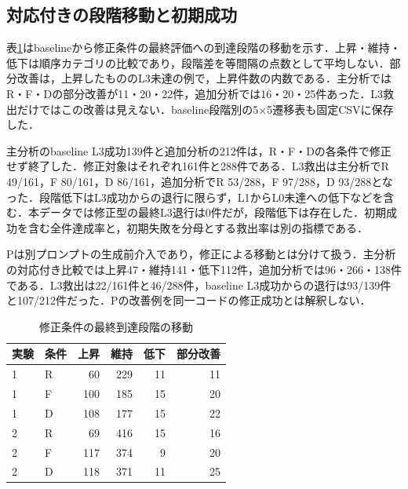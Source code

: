 \subsection{対応付きの段階移動と初期成功}
表\ref{tab:movement}はbaselineから修正条件の最終評価への到達段階の移動を示す．上昇・維持・低下は順序カテゴリの比較であり，段階差を等間隔の点数として平均しない．部分改善は，上昇したもののL3未達の例で，上昇件数の内数である．主分析ではR・F・Dの部分改善が11・20・22件，追加分析では16・20・25件あった．L3救出だけではこの改善は見えない．baseline段階別の5×5遷移表も固定CSVに保存した．

主分析のbaseline L3成功139件と追加分析の212件は，R・F・Dの各条件で修正せず終了した．修正対象はそれぞれ161件と288件である．L3救出は主分析でR 49/161，F 80/161，D 86/161，追加分析でR 53/288，F 97/288，D 93/288となった．段階低下はL3成功からの退行に限らず，L1からL0未達への低下などを含む．本データでは修正型の最終L3退行は0件だが，段階低下は存在した．初期成功を含む全件達成率と，初期失敗を分母とする救出率は別の指標である．

Pは別プロンプトの生成前介入であり，修正による移動とは分けて扱う．主分析の対応付き比較では上昇47・維持141・低下112件，追加分析では96・266・138件である．L3救出は22/161件と46/288件，baseline L3成功からの退行は93/139件と107/212件だった．Pの改善例を同一コードの修正成功とは解釈しない．
\begin{table}[t]
\centering
\caption{修正条件の最終到達段階の移動}
\label{tab:movement}
\begin{tabular}{ll|rrrr}
\hline
実験 & 条件 & 上昇 & 維持 & 低下 & 部分改善 \\
\hline
1 & R & 60 & 229 & 11 & 11 \\
1 & F & 100 & 185 & 15 & 20 \\
1 & D & 108 & 177 & 15 & 22 \\
2 & R & 69 & 416 & 15 & 16 \\
2 & F & 117 & 374 & 9 & 20 \\
2 & D & 118 & 371 & 11 & 25 \\
\hline
\end{tabular}
\end{table}

